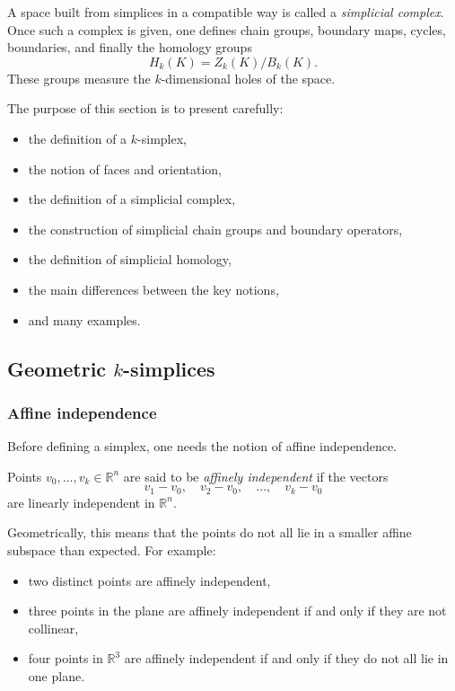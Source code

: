 \documentclass[12pt,a4paper]{article}
\theoremstyle{notespace}
\begin{document}
A space built from simplices in a compatible way is called a \emph{simplicial complex}. Once such a complex is given, one defines chain groups, boundary maps, cycles, boundaries, and finally the homology groups
\[
H_k(K)=Z_k(K)/B_k(K).
\]
These groups measure the \(k\)-dimensional holes of the space.

The purpose of this section is to present carefully:
\begin{itemize}
	\item the definition of a \(k\)-simplex,
	\item the notion of faces and orientation,
	\item the definition of a simplicial complex,
	\item the construction of simplicial chain groups and boundary operators,
	\item the definition of simplicial homology,
	\item the main differences between the key notions,
	\item and many examples.
\end{itemize}

\subsection{Geometric \texorpdfstring{$k$}{k}-simplices}

\subsubsection{Affine independence}

Before defining a simplex, one needs the notion of affine independence.

Points \(v_0,\dots,v_k\in \mathbb{R}^n\) are said to be \emph{affinely independent} if the vectors
\[
v_1-v_0,\quad v_2-v_0,\quad \dots,\quad v_k-v_0
\]
are linearly independent in \(\mathbb{R}^n\).

Geometrically, this means that the points do not all lie in a smaller affine subspace than expected. For example:
\begin{itemize}
	\item two distinct points are affinely independent,
	\item three points in the plane are affinely independent if and only if they are not collinear,
	\item four points in \(\mathbb{R}^3\) are affinely independent if and only if they do not all lie in one plane.
\end{itemize}
\end{document}
